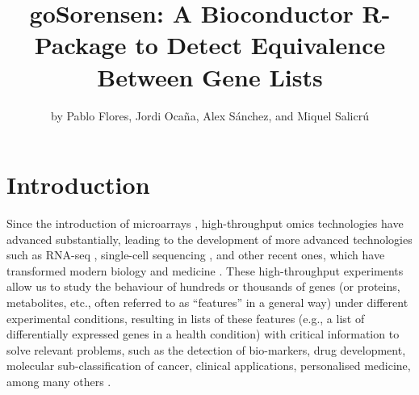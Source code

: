 \title{goSorensen: A Bioconductor R-Package to Detect Equivalence Between Gene Lists}


\author{by Pablo Flores, Jordi Ocaña, Alex Sánchez, and Miquel Salicrú}

\maketitle


\section{Introduction}\label{introduction}

Since the introduction of microarrays \citep{schena1995quantitative, nguyen2002dna}, high-throughput omics technologies have advanced substantially, leading to the development of more advanced technologies such as RNA-seq \citep{chu2012rna, van2019rna}, single-cell sequencing \citep{jovic2022single}, and other recent ones, which have transformed modern biology and medicine \citep{lee2023principles, negi2022applications}.
These high-throughput experiments allow us to study the behaviour of hundreds or thousands of genes (or proteins, metabolites, etc., often referred to as ``features'' in a general way) under different experimental conditions, resulting in lists of these features (e.g., a list of differentially expressed genes in a health condition) with critical information to solve relevant problems, such as the detection of bio-markers, drug development, molecular sub-classification of cancer, clinical applications, personalised medicine, among many others \citep{climente2017functional, cieslik2018cancer, pedersen2016clinical, jain2004applications}.

